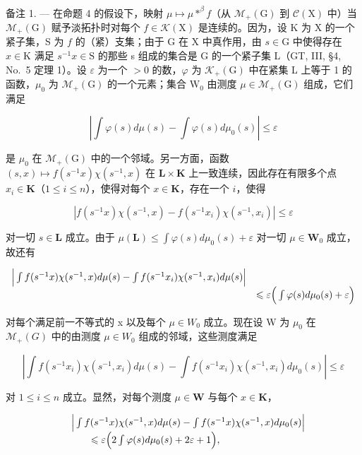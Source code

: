 备注 1. --- 在命题 4 的假设下，映射 \(\mu \mapsto \mu *^{\beta}f\)（从 \(\mathcal{M}_{+}(\mathrm{G})\) 到 \(\mathcal{C}(\mathrm{X})\) 中）当 \(\mathcal{M}_{+}(\mathrm{G})\) 赋予淡拓扑时对每个 \(f\in \mathcal{K}(\mathrm{X})\) 是连续的。因为，设 K 为 X 的一个紧子集，S 为 \(f\) 的（紧）支集；由于 G 在 X 中真作用，由 \(s\in \mathrm{G}\) 中使得存在 \(x\in \mathrm{K}\) 满足 \(s^{-1}x\in \mathrm{S}\) 的那些 s 组成的集合是 G 的一个紧子集 L（GT, III, §4, No.~5 定理 1）。设 \(\varepsilon\) 为一个 \(>0\) 的数，\(\varphi\) 为 \(\mathcal{K}_{+}(\mathrm{G})\) 中在紧集 L 上等于 1 的函数，\(\mu_0\) 为 \(\mathcal{M}_{+}(\mathrm{G})\) 的一个元素；集合 \(\mathrm{W}_0\) 由测度 \(\mu \in \mathcal{M}_{+}(\mathrm{G})\) 组成，它们满足

\[
\left| \int \varphi (s) d \mu (s) - \int \varphi (s) d \mu_ {0} (s) \right| \leqslant \varepsilon
\]

是 \(\mu_0\) 在 \(\mathcal{M}_{+}(\mathrm{G})\) 中的一个邻域。另一方面，函数 \((s,x)\mapsto f(s^{-1}x)\chi (s^{-1},x)\) 在 \(\mathbf{L}\times \mathbf{K}\) 上一致连续，因此存在有限多个点 \(x_{i}\in \mathbf{K}\)（\(1\leqslant i\leqslant n\)），使得对每个 \(x\in \mathbf{K}\)，存在一个 \(i\)，使得

\[
\left| f (s ^ {- 1} x) \chi (s ^ {- 1}, x) - f (s ^ {- 1} x _ {i}) \chi (s ^ {- 1}, x _ {i}) \right| \leqslant \varepsilon
\]

对一切 \(s \in \mathbf{L}\) 成立。由于 \(\mu(\mathbf{L}) \leqslant \int \varphi(s) d\mu_0(s) + \varepsilon\) 对一切 \(\mu \in \mathbf{W}_0\) 成立，故还有

\[
\begin{array}{r l} \Big | \int f (s ^ {- 1} x) \chi (s ^ {- 1}, x) d \mu (s) - \int f (s ^ {- 1} x _ {i}) \chi (s ^ {- 1}, x _ {i}) d \mu (s) \Big | & \\ & \leqslant \varepsilon \Big (\int \varphi (s) d \mu_ {0} (s) + \varepsilon \Big) \end{array}
\]

对每个满足前一不等式的 x 以及每个 \(\mu \in W_{0}\) 成立。现在设 W 为 \(\mu_{0}\) 在 \(\mathcal{M}_{+}(G)\) 中的由测度 \(\mu \in W_{0}\) 组成的邻域，这些测度满足

\[
\left| \int f (s ^ {- 1} x _ {i}) \chi (s ^ {- 1}, x _ {i}) d \mu (s) - \int f (s ^ {- 1} x _ {i}) \chi (s ^ {- 1}, x _ {i}) d \mu_ {0} (s) \right| \leqslant \varepsilon
\]

对 \(1 \leqslant i \leqslant n\) 成立。显然，对每个测度 \(\mu \in \mathbf{W}\) 与每个 \(x \in \mathbf{K}\)，

\[
\begin{array}{r l} & {\Big | \int f (s ^ {- 1} x) \chi (s ^ {- 1}, x) d \mu (s) - \int f (s ^ {- 1} x) \chi (s ^ {- 1}, x) d \mu_ {0} (s) \Big |} \\ & {\qquad \leqslant \varepsilon \Big (2 \int \varphi (s) d \mu_ {0} (s) + 2 \varepsilon + 1 \Big),} \end{array}
\]

